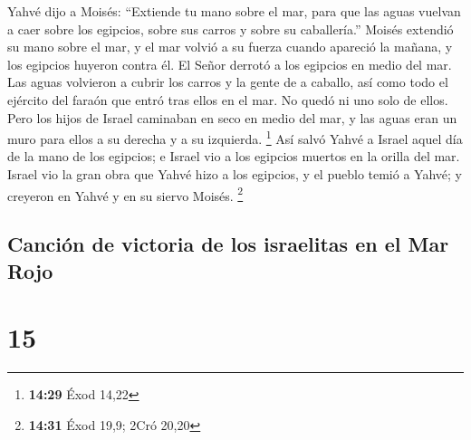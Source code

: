  Yahvé dijo a Moisés: ``Extiende tu mano sobre el mar,
para que las aguas vuelvan a caer sobre los egipcios, sobre sus carros y
sobre su caballería.''  Moisés extendió su mano sobre el
mar, y el mar volvió a su fuerza cuando apareció la mañana, y los
egipcios huyeron contra él. El Señor derrotó a los egipcios en medio del
mar.  Las aguas volvieron a cubrir los carros y la gente
de a caballo, así como todo el ejército del faraón que entró tras ellos
en el mar. No quedó ni uno solo de ellos.  Pero los hijos
de Israel caminaban en seco en medio del mar, y las aguas eran un muro
para ellos a su derecha y a su izquierda. \footnote{\textbf{14:29} Éxod
  14,22}  Así salvó Yahvé a Israel aquel día de la mano
de los egipcios; e Israel vio a los egipcios muertos en la orilla del
mar.  Israel vio la gran obra que Yahvé hizo a los
egipcios, y el pueblo temió a Yahvé; y creyeron en Yahvé y en su siervo
Moisés. \footnote{\textbf{14:31} Éxod 19,9; 2Cró 20,20}

\hypertarget{canciuxf3n-de-victoria-de-los-israelitas-en-el-mar-rojo}{%
\subsection{Canción de victoria de los israelitas en el Mar
Rojo}\label{canciuxf3n-de-victoria-de-los-israelitas-en-el-mar-rojo}}

\hypertarget{section-14}{%
\section{15}\label{section-14}}

